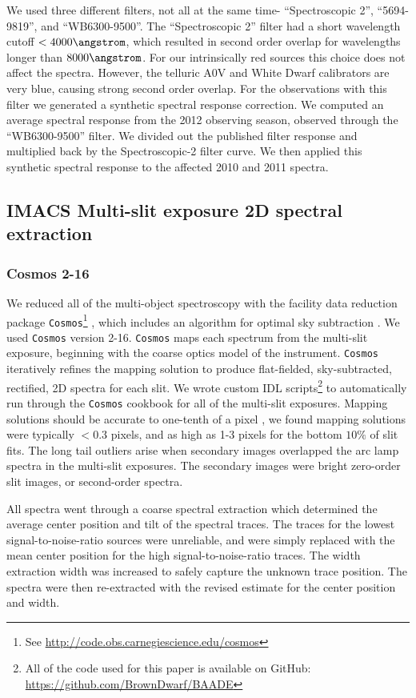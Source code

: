 We used three different filters, not all at the same time- ``Spectroscopic 2'', ``5694-9819'', and ``WB6300-9500''.  The ``Spectroscopic 2'' filter had a short wavelength cutoff $<4000 \angstrom$, which resulted in second order overlap for wavelengths longer than $8000 \angstrom$.  For our intrinsically red sources this choice does not affect the spectra.  However, the telluric A0V and White Dwarf calibrators are very blue, causing strong second order overlap.  For the observations with this filter we generated a synthetic spectral response correction.  We computed an average spectral response from the 2012 observing season, observed through the ``WB6300-9500'' filter.  We divided out the published filter response and multiplied back by the Spectroscopic-2 filter curve.  We then applied this synthetic spectral response to the affected 2010 and 2011 spectra.

\subsection{IMACS Multi-slit exposure 2D spectral extraction}
\subsubsection{Cosmos 2-16}
We reduced all of the multi-object spectroscopy with the facility data reduction package \texttt{Cosmos}\footnote{See \url{http://code.obs.carnegiescience.edu/cosmos}} \citep{2011PASP..123..288D} , which includes an algorithm for optimal sky subtraction \citep{2003PASP..115..688K}.  We used \texttt{Cosmos} version 2-16.  \texttt{Cosmos} maps each spectrum from the multi-slit exposure, beginning with the coarse optics model of the instrument.  \texttt{Cosmos} iteratively refines the mapping solution to produce flat-fielded, sky-subtracted, rectified, 2D spectra for each slit.  We wrote custom IDL scripts\footnote{All of the code used for this paper is available on GitHub: \url{https://github.com/BrownDwarf/BAADE}} to automatically run through the \texttt{Cosmos} cookbook for all of the multi-slit exposures.  Mapping solutions should be accurate to one-tenth of a pixel \citep{2011PASP..123..288D}, we found mapping solutions were typically $<0.3$ pixels, and as high as 1-3 pixels for the bottom $10\%$ of slit fits.  The long tail outliers arise when secondary images overlapped the arc lamp spectra in the multi-slit exposures.  The secondary images were bright zero-order slit images, or second-order spectra.


All spectra went through a coarse spectral extraction which determined the average center position and tilt of the spectral traces.  The traces for the lowest signal-to-noise-ratio sources were unreliable, and were simply replaced with the mean center position for the high signal-to-noise-ratio traces.  The width extraction width was increased to safely capture the unknown trace position.  The spectra were then re-extracted with the revised estimate for the center position and width.

